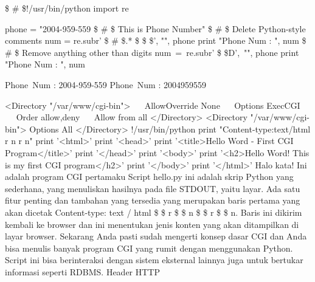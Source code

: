 \noindent 
 \$  \#  \$!/usr/bin/python 
\noindent 
import re \par
\BEGIN{12pt}
\noindent 
phone = "2004-959-559  \$  \#  \$ This is Phone Number" 
\vspace{12pt}
\noindent 
 \$  \#  \$ Delete Python-style comments 
\noindent 
num = re.sub{r' \$  \#  \$.* \$  \$  \$', "", phone} 
\noindent 
print "Phone Num : ", num 
\vspace{12pt}
\noindent 
 \$  \#  \$ Remove anything other than digits 
\noindent 
num~=~re.sub{r' \$  \setminus  \$D',~"", phone}     
\noindent 
print "Phone Num : ", num 
\begin{12pt}
\item 
Phone~Num :  2004-959-559 
\noindent 
Phone~Num :  2004959559 
\begin{12pt}
\noindent 
<Directory "/var/www/cgi-bin"> 
\noindent 
~~ AllowOverride None 
\noindent 
~~ Options ExecCGI 
\noindent 
~~ Order allow,deny 
\noindent 
~~ Allow from all 
\noindent 
</Directory> 
\vspace{12pt}
\noindent 
<Directory "/var/www/cgi-bin"> 
\noindent 
Options All
\noindent 
</Directory> 
\vspace{12pt}
\noindent 
!/usr/bin/python 
\vspace{12pt}
\noindent 
print "Content-type:text/html   \setminus  r   \setminus  n   \setminus  r   \setminus  n" 
\noindent 
print '<html>' 
\noindent 
print '<head>' 
\noindent 
print '<title>Hello Word - First CGI Program</title>' 
\noindent 
print '</head>' 
\noindent 
print '<body>' 
\noindent 
print '<h2>Hello Word! This is my first CGI program</h2>' 
\noindent 
print '</body>' 
\noindent 
print '</html>' 
\vspace{12pt}
\vspace{12pt}
\noindent 
Halo kata! Ini adalah program CGI pertamaku 
\vspace{12pt}
Script hello.py ini adalah skrip Python yang sederhana, yang menuliskan hasilnya pada file STDOUT, yaitu layar. Ada satu fitur penting dan tambahan yang tersedia yang merupakan baris pertama yang akan dicetak Content-type: text / html  \$  \setminus  \$ r  \$  \setminus  \$ n  \$  \setminus  \$ r  \$  \setminus  \$ n. Baris ini dikirim kembali ke browser dan ini menentukan jenis konten yang akan ditampilkan di layar browser. Sekarang Anda pasti sudah mengerti konsep dasar CGI dan Anda bisa menulis banyak program CGI yang rumit dengan menggunakan Python. Script ini bisa berinteraksi dengan sistem eksternal lainnya juga untuk bertukar informasi seperti RDBMS. 
Header HTTP 

\end{12pt}
\end{12pt}
